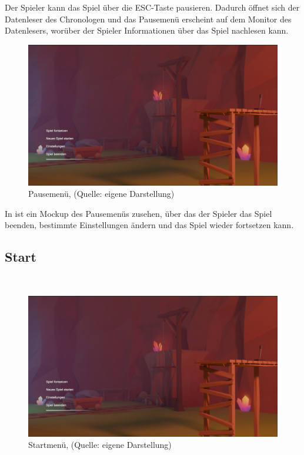 Der Spieler kann das Spiel über die \ac{ESC}-Taste pausieren. Dadurch öffnet sich der Datenleser des Chronologen und das Pausemenü erscheint auf dem Monitor des Datenlesers, worüber der Spieler Informationen über das Spiel nachlesen kann.
~
\begin{figure}[ht]
\centering
\includegraphics[width=1\linewidth]{content/pictures/StartScreen.jpg}
\caption{Pausemenü, (Quelle: eigene Darstellung)}
\label{fig:pausemenu}
\end{figure}

In  ist ein Mockup des Pausemenüs zusehen, über das der Spieler das Spiel beenden, bestimmte Einstellungen ändern und das Spiel wieder fortsetzen kann.

\subsection{Start}
~
\begin{figure}[ht]
\centering
\includegraphics[width=1\linewidth]{content/pictures/StartScreen.jpg}
\caption{Startmenü, (Quelle: eigene Darstellung)}
\label{fig:mainmenu}
\end{figure}

